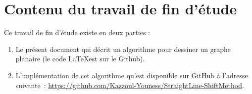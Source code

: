 \documentclass[hidelinks,letterpaper,12pt]{article}
\begin{document}
	\addtocounter{page}{-1}%
	\newpage

	\section{Contenu du travail de fin d'étude}
	\thispagestyle{empty}
Ce travail de fin d'étude existe en deux parties : 
\begin{enumerate}
    \item Le présent document qui décrit un algorithme pour dessiner un graphe planaire (le code \LaTeX est sur le Github).
    \item L'implémentation de cet algorithme qu'est disponible sur GitHub à
l’adresse suivante :  \url{https://github.com/Kazzoul-Youness/StraightLine-ShiftMethod}.
\end{enumerate}
	\addtocounter{page}{-1}%
	\newpage
	
\cleardoublepage
{}	
\tableofcontents		
\cleardoublepage
{}

\newpage
\thispagestyle{empty}
\mbox{}
\newpage

\end{document}
